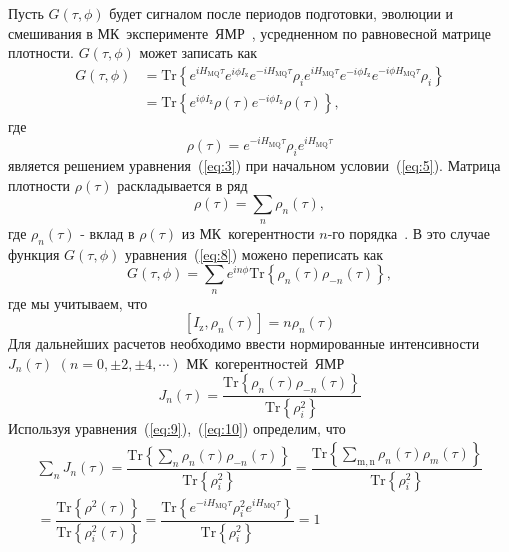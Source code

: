 \documentclass[utf8]{jetp}
\begin{document}
Пусть $G(\tau,\phi)$ будет сигналом после периодов подготовки, эволюции и смешивания в МК~эксперименте~ЯМР~\cite{Baum_1985}, усредненном по равновесной матрице плотности. 
$G(\tau,\phi)$ может записать как~\cite{Doronin_2019}
%
\begin{equation}
  \begin{split}
    \label{eq:8}
    G(\tau,\phi)
    & = \mathrm{Tr}\left\{
      e^{i H_\mathrm{MQ} \tau} e^{i\phi I_\mathrm{z}} e^{-i H_\mathrm{MQ}\tau}
      \rho_i
      e^{i H_\mathrm{MQ} \tau} e^{-i \phi I_\mathrm{z}} e^{-i \phi H_\mathrm{MQ} \tau}
      \rho_i
    \right\} \\
    & = \mathrm{Tr} \left\{
    e^{i \phi I_\mathrm{z}}
    \rho(\tau)
    e^{-i \phi I_\mathrm{z}}
    \rho(\tau)
    \right\},
  \end{split}
\end{equation}
%
где
%
\begin{equation}
  \label{eq:9}
  \rho(\tau)
  = e^{-i H_\mathrm{MQ} \tau }
  \rho_i
  e^{i H_\mathrm{MQ} \tau}
\end{equation}
%
является решением уравнения~(\ref{eq:3}) при начальном условии~(\ref{eq:5}).
Матрица плотности $\rho(\tau)$ раскладывается в ряд
%
\begin{equation}
  \label{eq:10}
  \rho(\tau) = \sum\limits_n \rho_n(\tau),
\end{equation}
%
где $\rho_{n}(\tau)$ - вклад в $\rho(\tau)$ из МК~когерентности $n$-го порядка~\cite{Fel_dman_1996}.
В это случае функция $G(\tau,\phi)$ уравнения~(\ref{eq:8}) можено переписать как
%
\begin{equation}
  \label{eq:11}
  G(\tau,\phi)
  = \sum\limits_n e^{i n \phi} \mathrm{Tr} \left\{
    \rho_{n}(\tau) \rho_{-n}(\tau)
  \right\},
\end{equation}
%
где мы учитываем, что
%
\begin{equation}
  \label{eq:12}
  \left[ I_{\mathrm{z}},\rho_n(\tau) \right] = n \rho_n(\tau)
\end{equation}
%
Для дальнейших расчетов необходимо ввести нормированные интенсивности $J_{n}(\tau)$ $(n=0, \pm 2, \pm 4, \cdots)$ МК~когерентностей~ЯМР
%
\begin{equation}
  \label{eq:13}
  J_{n}(\tau) = \dfrac{\mathrm{Tr} \left\{
  \rho_{n}(\tau) \rho_{-n}(\tau)
  \right\}}
  {\mathrm{Tr} \left\{\rho^2_{i} \right\}}
\end{equation}
%
Используя уравнения~(\ref{eq:9}),~(\ref{eq:10}) определим, что
%
\begin{multline}
  \label{eq:14}
  \sum\limits_{n} J_{n}(\tau)
  = \dfrac{
    \mathrm{Tr} \left\{
      \sum_{n} \rho_{n}(\tau) \rho_{-n}(\tau)
    \right\}}
  {\mathrm{Tr} \left\{ \rho^2_{i} \right\}}
  = \dfrac{
    \mathrm{Tr} \left\{
      \sum_{\mathrm{m,n}} \rho_n(\tau)\rho_m(\tau)
  \right\}}
  {\mathrm{Tr} \left\{\rho^2_{i}\right\}}
  \\
  = \dfrac{
    \mathrm{Tr}\left\{\rho^2(\tau)\right\}
  }
  {
    \mathrm{Tr}\left\{\rho^2_{i}(\tau)\right\}
  }
  = \dfrac{
    \mathrm{Tr} \left\{
      e^{-i H_\mathrm{MQ} \tau}
      \rho^{2}_{i}
      e^{i H_\mathrm{MQ} \tau}
    \right\}
  }
  {
    \mathrm{Tr} \left\{ \rho_{i}^{2} \right\}
  }
  = 1
\end{multline}
\end{document}

